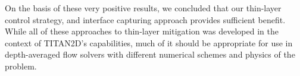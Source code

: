 \documentclass[letterpaper,10pt]{article}
\begin{document}
%
On the basis of these very positive results, we concluded that our 
thin-layer control strategy, and interface capturing approach provides sufficient benefit. 
While all of these approaches to thin-layer mitigation was developed in the 
context of TITAN2D's capabilities, much of it should be appropriate 
for use in depth-averaged flow solvers with different numerical 
schemes and physics of the problem.
\newpage
\appendix
 


\end{document}
